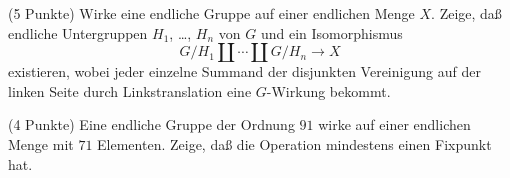 \documentclass{algsheet}
\begin{document}
\begin{exercise}(5 Punkte)\newline
    Wirke eine endliche Gruppe auf einer endlichen Menge \(X\). Zeige, daß
    endliche Untergruppen \(H_1\), \dots, \(H_n\) von \(G\) und ein Isomorphismus
    \begin{equation}
        G/H_1 \amalg \dotsb \amalg G/H_n \to X
    \end{equation}
    existieren, wobei jeder einzelne Summand der disjunkten Vereinigung auf der
    linken Seite durch Linkstranslation eine \(G\)-Wirkung bekommt.
\end{exercise}

\begin{exercise}(4 Punkte)\newline
    Eine endliche Gruppe der Ordnung \(91\) wirke auf einer endlichen
    Menge mit \(71\) Elementen.
    Zeige, daß die Operation mindestens einen Fixpunkt hat.
\end{exercise}
\end{document}
